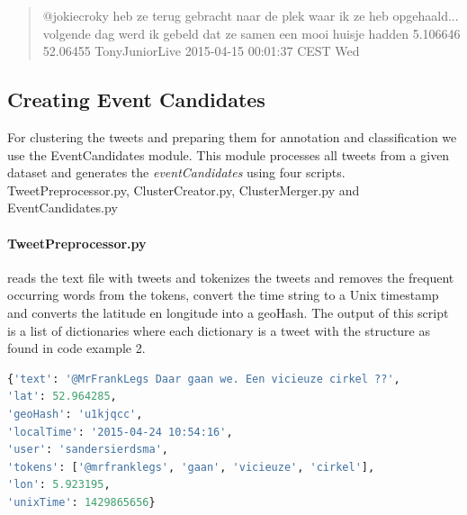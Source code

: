 \documentclass[
10pt, %
a4paper, %
oneside, %
headinclude,footinclude, %
BCOR5mm, %
]{scrartcl}
\begin{document}
\begin{quote}
@jokiecroky heb ze terug gebracht naar de plek waar ik ze heb opgehaald... volgende dag werd ik gebeld dat ze samen een mooi huisje hadden	5.106646 52.06455	TonyJuniorLive	2015-04-15 00:01:37 CEST Wed
\end{quote}


\subsection{Creating Event Candidates}
For clustering the tweets and preparing them for annotation and classification we use the EventCandidates module. This module processes all tweets from a given dataset and generates the \textit{eventCandidates} using four scripts. TweetPreprocessor.py, ClusterCreator.py, ClusterMerger.py and EventCandidates.py

\paragraph{TweetPreprocessor.py}reads the text file with tweets and tokenizes the tweets and removes the frequent occurring words from the tokens, convert the time string to a Unix timestamp and converts the latitude en longitude into a geoHash. The output of this script is a list of dictionaries where each dictionary is a tweet with the structure as found in code example 2.

\begin{lstlisting}[language=Python, caption=Tweet dictionary]
{'text': '@MrFrankLegs Daar gaan we. Een vicieuze cirkel ??', 
'lat': 52.964285, 
'geoHash': 'u1kjqcc', 
'localTime': '2015-04-24 10:54:16', 
'user': 'sandersierdsma', 
'tokens': ['@mrfranklegs', 'gaan', 'vicieuze', 'cirkel'], 
'lon': 5.923195, 
'unixTime': 1429865656}
\end{lstlisting}
\newpage
\end{document}
